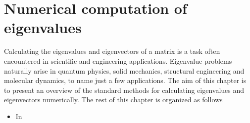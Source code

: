 \chapter{Numerical computation of eigenvalues}%
\label{cha:numerical_computation_of_eigenvalues}

Calculating the eigenvalues and eigenvectors of a matrix is a task often encountered in scientific and engineering applications.
Eigenvalue problems naturally arise in quantum physics,
solid mechanics, structural engineering and molecular dynamics,
to name just a few applications.
The aim of this chapter is to present an overview of the standard methods for calculating eigenvalues and eigenvectors numerically.
The rest of this chapter is organized as follows
\begin{itemize}
    \item In 
\end{itemize}

\section{}
\label{sec:review_eigenvalue_problems}
